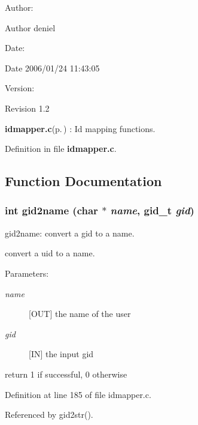 \begin{Desc}
\item[Author:]\begin{Desc}
\item[Author]deniel \end{Desc}
\end{Desc}
\begin{Desc}
\item[Date:]\begin{Desc}
\item[Date]2006/01/24 11:43:05 \end{Desc}
\end{Desc}
\begin{Desc}
\item[Version:]\begin{Desc}
\item[Revision]1.2 \end{Desc}
\end{Desc}
{\bf idmapper.c}{\rm (p.\,\pageref{idmapper_8c})} : Id mapping functions.

Definition in file {\bf idmapper.c}.

\subsection{Function Documentation}
\subsubsection{\setlength{\rightskip}{0pt plus 5cm}int gid2name (char $\ast$ {\em name}, gid\_\-t {\em gid})}\label{idmapper_8c_a2}


gid2name: convert a gid to a name.

convert a uid to a name.

\begin{Desc}
\item[Parameters:]
\begin{description}
\item[{\em name}][OUT] the name of the user \item[{\em gid}][IN] the input gid\end{description}
\end{Desc}
return 1 if successful, 0 otherwise 

Definition at line 185 of file idmapper.c.

Referenced by gid2str().
